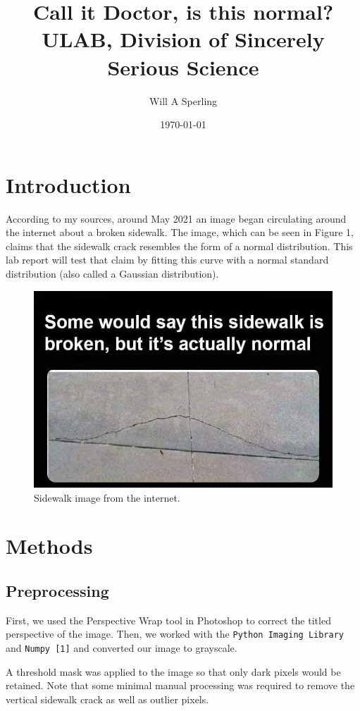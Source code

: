 \documentclass{article}
\title{Call it Doctor, is this normal?\\ \large ULAB, Division of Sincerely Serious Science}
\author{Will A Sperling}
\date{\today}
\begin{document}
\maketitle

\section{Introduction}
According to my sources, around May 2021 an image began circulating around the internet about a broken sidewalk. The image, which can be seen in Figure 1, claims that the sidewalk crack resembles the form of a normal distribution. This lab report will test that claim by fitting this curve with a normal standard distribution (also called a Gaussian distribution).
\begin{figure}[h]
    \centering
    \includegraphics[width=0.8\linewidth]{img.jpg} 
    \caption{Sidewalk image from the internet.}
    \label{fig:example}
\end{figure}

\section{Methods}
\subsection{Preprocessing}
First, we used the Perspective Wrap tool in Photoshop to correct the titled perspective of the image. Then, we worked with the \texttt{Python Imaging Library} and \texttt{Numpy [1]} and converted our image to grayscale.

A threshold mask was applied to the image so that only dark pixels would be retained. Note that some minimal manual processing was required to remove the vertical sidewalk crack as well as outlier pixels.
\end{document}
